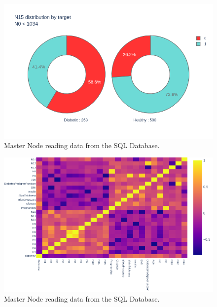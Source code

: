\documentclass[12pt]{article}
\begin{document}
\begin{figure}[ht]
\centering
\includegraphics[width=1\textwidth]{newplot(41).png}
\caption{Master Node reading data from the SQL Database.}
\end{figure}

\begin{figure}[ht]
\centering
\includegraphics[width=1\textwidth]{newplot(42).png}
\caption{Master Node reading data from the SQL Database.}
\end{figure}
\end{document}
